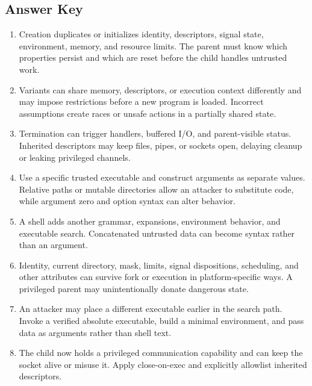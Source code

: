\documentclass[11pt,letterpaper]{article}
\begin{document}
\subsection*{Answer Key}
\begin{enumerate}
\item Creation duplicates or initializes identity, descriptors, signal state, environment, memory, and resource limits. The parent must know which properties persist and which are reset before the child handles untrusted work.
\item Variants can share memory, descriptors, or execution context differently and may impose restrictions before a new program is loaded. Incorrect assumptions create races or unsafe actions in a partially shared state.
\item Termination can trigger handlers, buffered I/O, and parent-visible status. Inherited descriptors may keep files, pipes, or sockets open, delaying cleanup or leaking privileged channels.
\item Use a specific trusted executable and construct arguments as separate values. Relative paths or mutable directories allow an attacker to substitute code, while argument zero and option syntax can alter behavior.
\item A shell adds another grammar, expansions, environment behavior, and executable search. Concatenated untrusted data can become syntax rather than an argument.
\item Identity, current directory, mask, limits, signal dispositions, scheduling, and other attributes can survive fork or execution in platform-specific ways. A privileged parent may unintentionally donate dangerous state.
\item An attacker may place a different executable earlier in the search path. Invoke a verified absolute executable, build a minimal environment, and pass data as arguments rather than shell text.
\item The child now holds a privileged communication capability and can keep the socket alive or misuse it. Apply close-on-exec and explicitly allowlist inherited descriptors.
\end{enumerate}
\end{document}
